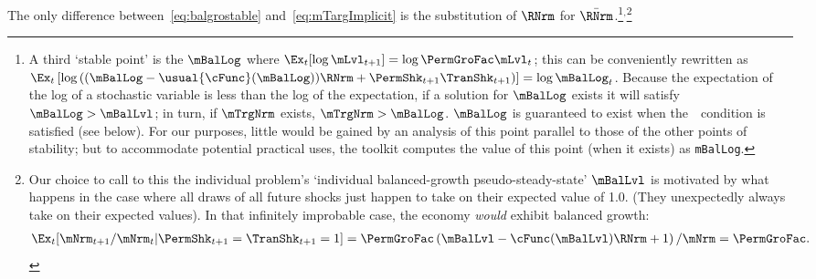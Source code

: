 \documentclass[BufferStockTheory]{subfiles}
\begin{document}
The only difference between~\eqref{eq:balgrostable} and~\eqref{eq:mTargImplicit} is the substitution of $\RNrm$ for $\bar{\RNrm}$.\footnote{A third `stable point' is the $\mBalLog$ where $\Ex_{t}[\log \mLvl_{t+1}] = \log \PermGroFac \mLvl_{t}$; this can be conveniently rewritten as $\Ex_{t}\left[\log\left((\mBalLog-\usual{\cFunc}(\mBalLog))\RNrm+\PermShk_{t+1}\TranShk_{t+1}\right)\right]  = \log \mBalLog_{t}$.  Because the expectation of the log of a stochastic variable is less than the log of the expectation, if a solution for $\mBalLog$ exists it will satisfy $\mBalLog > \mBalLvl$; in turn, if $\mTrgNrm$ exists, $\mTrgNrm>\mBalLog$.  $\mBalLog$ is guaranteed to exist when the~{\GICSdl}~condition is satisfied (see below).  For our purposes, little would be gained by an analysis of this point parallel to those of the other points of stability; but to accommodate potential practical uses,  the {\ARKurl} toolkit computes the value of this point (when it exists) as \texttt{mBalLog}.}$^{,}$\footnote{Our choice to call to this the individual problem's `individual balanced-growth pseudo-steady-state' $\mBalLvl$ is motivated by what happens in the case where all draws of all future shocks just happen to take on their expected value of 1.0.  (They unexpectedly always take on their expected values).  In that infinitely improbable case, the economy \textit{would} exhibit balanced growth:
  \begin{align*}
    \Ex_{t}[\mNrm_{t+1}/\mNrm_{t}|\PermShk_{t+1}=\TranShk_{t+1}=1] = \PermGroFac \left(\mBalLvl-\cFunc(\mBalLvl)\RNrm + 1 \right)/\mNrm = \PermGroFac.
  \end{align*}}
\end{document}
